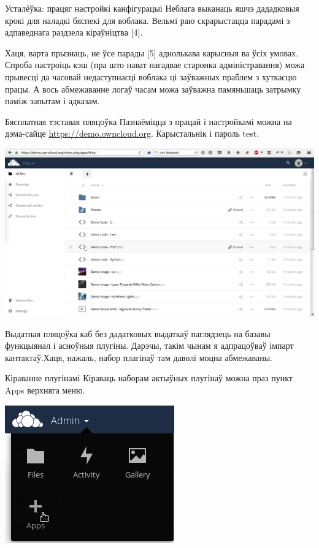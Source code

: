 \documentclass[ignorenonframetext,hyperref={pdftex,unicode}]{beamer}
\begin{document}
\begin{frame}{Усталёўка: працяг настройкі канфігурацыі}
	Неблага выканаць яшчэ дададковыя крокі для наладкі бяспекі для воблака. Вельмі раю скрарыстацца парадамі з адпаведнага раздзела кіраўніцтва [4]. 

	Хаця, варта прызнаць, не ўсе парады [5] аднолькава карысныя ва ўсіх умовах. Спроба настроіць кэш (пра што нават нагадвае старонка адміністравання) можа прывесці да часовай недаступнасці воблака ці заўважных праблем з хуткасцю працы. А вось абмежаванне логаў часам можа заўважна памяньшаць затрымку паміж запытам і адказам.
\end{frame}

\begin{frame}{Бясплатная тэставая пляцоўка}
	Пазнаёміцца з працай і настройкамі можна на дэма-сайце \url{https://demo.owncloud.org}. Карыстальнік і пароль test. 

	\begin{center}
 		\includegraphics[height=0.5\textheight,keepaspectratio]{demo}
	\end{center}
	
	Выдатная пляцоўка каб без дадатковых выдаткаў паглядзець на базавы функцыянал і асноўныя плугіны. Дарэчы, такім чынам я адпрацоўваў імпарт кантактаў.Хаця, нажаль, набор плагінаў там даволі моцна абмежаваны.
\end{frame}

\begin{frame}{Кіраванне плугінамі}
	Кіраваць наборам актыўных плугінаў можна праз пункт Apps верхняга меню.

	\begin{center}
 		\includegraphics[height=0.4\textheight,keepaspectratio]{apps}
	\end{center}
\end{frame}
\end{document}
